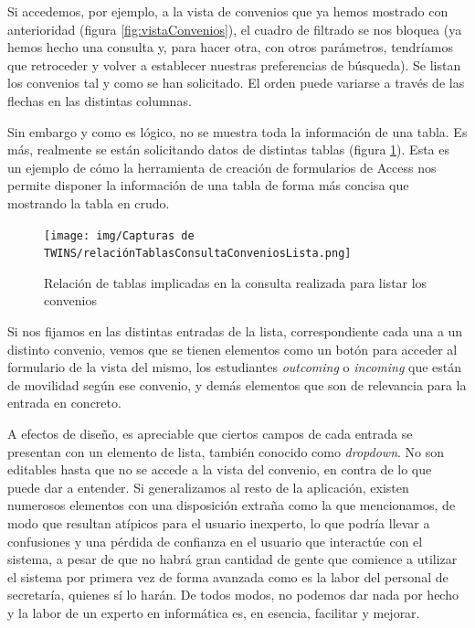 Si accedemos, por ejemplo, a la vista de convenios que ya hemos mostrado con anterioridad (figura \ref{fig:vistaConvenios}), el cuadro de filtrado se nos bloquea (ya hemos hecho una consulta y, para hacer otra, con otros parámetros, tendríamos que retroceder y volver a establecer nuestras preferencias de búsqueda). Se listan los convenios tal y como se han solicitado. El orden puede variarse a través de las flechas en las distintas columnas.

Sin embargo y como es lógico, no se muestra toda la información de una tabla. Es más, realmente se están solicitando datos de distintas tablas (figura \ref{fig:tablasConsultaConvenios}). Esta es un ejemplo de cómo la herramienta de creación de formularios de Access nos permite disponer la información de una tabla de forma más concisa que mostrando la tabla en crudo.

\begin{figure}
	\centering
	\texttt{[image: img/Capturas de TWINS/relaciónTablasConsultaConveniosLista.png]}
	\caption[Tablas implicadas en consultar convenios]{Relación de tablas implicadas en la consulta realizada para listar los convenios}
	\label{fig:tablasConsultaConvenios}
\end{figure}

Si nos fijamos en las distintas entradas de la lista, correspondiente cada una a un distinto convenio, vemos que se tienen elementos como un botón para acceder al formulario de la vista del mismo, los estudiantes \textit{outcoming} o \textit{incoming} que están de movilidad según ese convenio, y demás elementos que son de relevancia para la entrada en concreto.

A efectos de diseño, es apreciable que ciertos campos de cada entrada se presentan con un elemento de lista, también conocido como \textit{dropdown}. No son editables hasta que no se accede a la vista del convenio, en contra de lo que puede dar a entender. Si generalizamos al resto de la aplicación, existen numerosos elementos con una disposición extraña como la que mencionamos, de modo que resultan atípicos para el usuario inexperto, lo que podría llevar a confusiones y una pérdida de confianza en el usuario que interactúe con el sistema, a pesar de que no habrá gran cantidad de gente que comience a utilizar el sistema por primera vez de forma avanzada como es la labor del personal de secretaría, quienes sí lo harán. De todos modos, no podemos dar nada por hecho y la labor de un experto en informática es, en esencia, facilitar y mejorar.

